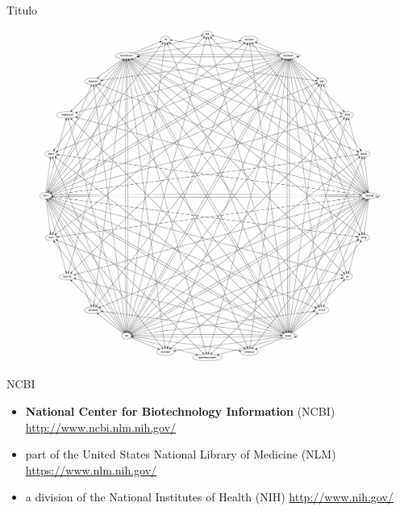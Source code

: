 \begin{frame}{Titulo}

\begin{figure}[htbp]
\centering
\includegraphics{images/diagram}
\end{figure}

\end{frame}

\begin{frame}{NCBI}

\begin{itemize}
\item
  \textbf{National Center for Biotechnology Information} (NCBI)
  \url{http://www.ncbi.nlm.nih.gov/}
\item
  part of the United States National Library of Medicine (NLM)
  \url{https://www.nlm.nih.gov/}
\item
  a division of the National Institutes of Health (NIH)
  \url{http://www.nih.gov/}
\end{itemize}

\end{frame}

